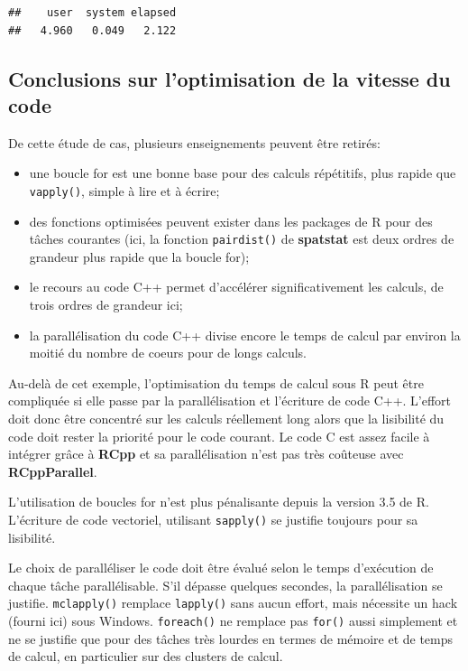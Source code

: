 \documentclass[
  12pt,
  french,
  a4paper,
  extrafontsizes,onecolumn,openright
  ]{memoir}
\providecommand{\tightlist}{%
  \setlength{\itemsep}{0pt}\setlength{\parskip}{0pt}}
\begin{document}
\begin{verbatim}
##    user  system elapsed 
##   4.960   0.049   2.122
\end{verbatim}

\normalsize

\hypertarget{conclusions-sur-loptimisation-de-la-vitesse-du-code}{%
\subsection{Conclusions sur l'optimisation de la vitesse du code}\label{conclusions-sur-loptimisation-de-la-vitesse-du-code}}

De cette étude de cas, plusieurs enseignements peuvent être retirés:

\begin{itemize}
\tightlist
\item
  une boucle for est une bonne base pour des calculs répétitifs, plus rapide que \texttt{vapply()}, simple à lire et à écrire;
\item
  des fonctions optimisées peuvent exister dans les packages de R pour des tâches courantes (ici, la fonction \texttt{pairdist()} de \textbf{spatstat} est deux ordres de grandeur plus rapide que la boucle for);
\item
  le recours au code C++ permet d'accélérer significativement les calculs, de trois ordres de grandeur ici;
\item
  la parallélisation du code C++ divise encore le temps de calcul par environ la moitié du nombre de coeurs pour de longs calculs.
\end{itemize}

Au-delà de cet exemple, l'optimisation du temps de calcul sous R peut être compliquée si elle passe par la parallélisation et l'écriture de code C++.
L'effort doit donc être concentré sur les calculs réellement long alors que la lisibilité du code doit rester la priorité pour le code courant.
Le code C est assez facile à intégrer grâce à \textbf{RCpp} et sa parallélisation n'est pas très coûteuse avec \textbf{RCppParallel}.

L'utilisation de boucles for n'est plus pénalisante depuis la version 3.5 de R.
L'écriture de code vectoriel, utilisant \texttt{sapply()} se justifie toujours pour sa lisibilité.

Le choix de paralléliser le code doit être évalué selon le temps d'exécution de chaque tâche parallélisable.
S'il dépasse quelques secondes, la parallélisation se justifie.
\texttt{mclapply()} remplace \texttt{lapply()} sans aucun effort, mais nécessite un hack (fourni ici) sous Windows.
\texttt{foreach()} ne remplace pas \texttt{for()} aussi simplement et ne se justifie que pour des tâches très lourdes en termes de mémoire et de temps de calcul, en particulier sur des clusters de calcul.
\end{document}
